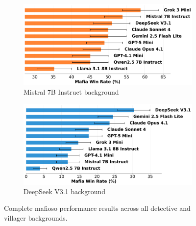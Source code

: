\documentclass{article}
\begin{document}
\begin{figure}[htbp]
    \begin{subfigure}[b]{0.48\textwidth}
        \centering
        \includegraphics[width=\textwidth]{../results/win_rates_deceive_mistral_7b_instruct.png}
        \caption{Mistral 7B Instruct background}
        \label{fig:mafioso_mistral_appendix}
    \end{subfigure}
    \hfill
    \begin{subfigure}[b]{0.48\textwidth}
        \centering
        \includegraphics[width=\textwidth]{../results/win_rates_deceive_deepseek_v31.png}
        \caption{DeepSeek V3.1 background}
        \label{fig:mafioso_deepseek_appendix}
    \end{subfigure}
    \caption{Complete mafioso performance results across all detective and villager backgrounds.}
    \label{fig:mafioso_complete}
\end{figure}
\end{document}
